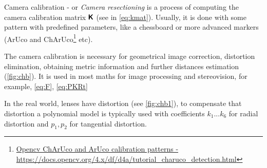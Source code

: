 Camera calibration - or \textit{Camera resectioning} is a process of computing the camera calibration matrix $\pmb{\mathsf{K}}$ (see in \eqref{eq:kmat}).
Usually, it is done with some pattern with predefined parameters, like a chessboard or more advanced markers (ArUco and ChArUco\footnote{\href{https://docs.opencv.org/4.x/df/d4a/tutorial_charuco_detection.html}{Opencv ChArUco and ArUco calibration patterns - \url{https://docs.opencv.org/4.x/df/d4a/tutorial_charuco_detection.html}}} etc).

The camera calibration is necessary for geometrical image correction, distortion elimination, obtaining metric information and further distances estimation (\autoref{fig:chb}). 
It is used in most maths for image processing and stereovision, for example, \eqref{eq:F}, \eqref{eq:PKRt}

In the real world, lenses have distortion (see \autoref{fig:chb1}), to compensate that distortion a polynomial model is typically used with coefficients $k_1 ... k_6$ for radial distortion and $p_1, p_2$ for tangential distortion.

